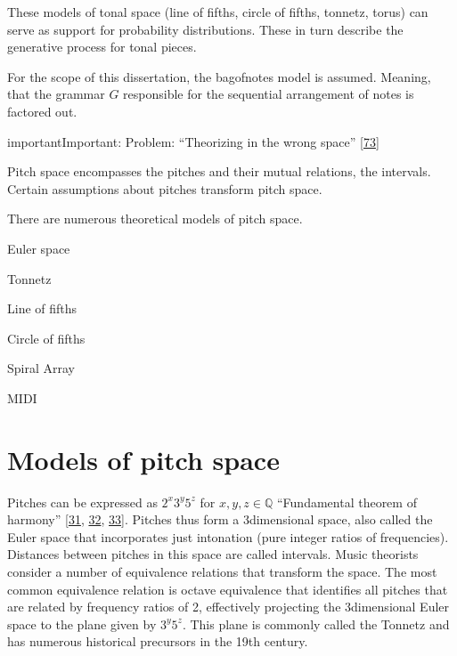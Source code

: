 \documentclass[letterpaper,10pt,english]{sphinxmanual}
\begin{document}
\sphinxAtStartPar
These models of tonal space (line of fifths, circle of fifths, tonnetz,
torus) can serve as support for probability distributions. These in turn
describe the generative process for tonal pieces.

\sphinxAtStartPar
For the scope of this dissertation, the bag\sphinxhyphen{}of\sphinxhyphen{}notes model is assumed.
Meaning, that the grammar \(G\) responsible for the sequential
arrangement of notes is factored out.

\begin{sphinxadmonition}{important}{Important:}
\sphinxAtStartPar
Problem: “Theorizing in the wrong space” {[}\hyperlink{cite.8_bibliography:id10}{73}{]}
\end{sphinxadmonition}

\sphinxAtStartPar
Pitch space encompasses the pitches and their mutual relations, the
intervals. Certain assumptions about pitches transform pitch space.

\sphinxAtStartPar
There are numerous theoretical models of pitch space.

\begin{DUlineblock}{0em}
\item[] \sphinxhyphen{} Euler space
\item[] \sphinxhyphen{} Tonnetz
\item[] \sphinxhyphen{} Line of fifths
\item[] \sphinxhyphen{} Circle of fifths
\item[] \sphinxhyphen{} Spiral Array
\item[] \sphinxhyphen{} MIDI
\end{DUlineblock}


\section{Models of pitch space}
\label{\detokenize{5_notes:models-of-pitch-space}}
\sphinxAtStartPar
Pitches can be expressed as \(2^x3^y5^z\) for
\(x,y,z\in \mathbb Q\) “Fundamental theorem of harmony”
{[}\hyperlink{cite.8_bibliography:id50}{31}, \hyperlink{cite.8_bibliography:id51}{32}, \hyperlink{cite.8_bibliography:id49}{33}{]}.
Pitches thus form a
3\sphinxhyphen{}dimensional space, also called the Euler space that incorporates just
intonation (pure integer ratios of frequencies). Distances between
pitches in this space are called intervals. Music theorists consider a
number of equivalence relations that transform the space. The most
common equivalence relation is octave equivalence that identifies all
pitches that are related by frequency ratios of 2, effectively
projecting the 3\sphinxhyphen{}dimensional Euler space to the plane given by
\(3^y5^z\). This plane is commonly called the Tonnetz and has
numerous historical precursors in the 19th century.
\end{document}
